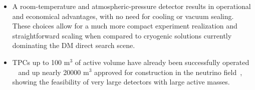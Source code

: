\documentclass[physics,article,submit,moreauthors,pdftex]{Definitions/mdpi}
\newcommand{\keV}{\ensuremath{\,\textrm{ke\hspace{-.08em}V}}\xspace}
\begin{document}
\begin{itemize}
\item A room-temperature and atmospheric-pressure detector results in operational and economical advantages, with no need for cooling or vacuum sealing. These choices allow for a much more compact experiment realization and straightforward scaling when compared to cryogenic solutions currently dominating the DM direct search scene.

\item TPCs up to 100 m$^{3}$ of active volume have already been successfully operated ~\cite{bib:alice, bib:tpc4} and up nearly 20000 m$^{3}$ approved for construction in the neutrino field~\cite{bib:dune}, showing the feasibility of very large detectors with large active masses.
\end{itemize}



\end{document}
